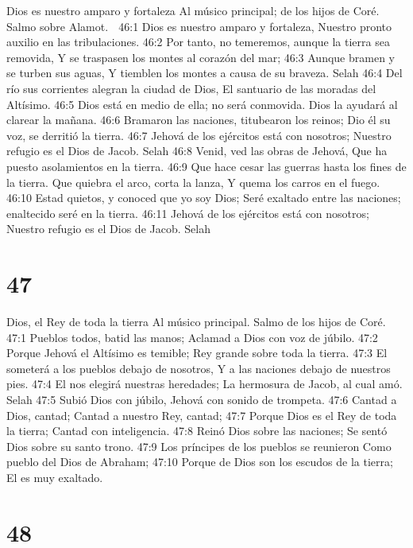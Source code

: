 Dios es nuestro amparo y fortaleza 
Al músico principal; de los hijos de Coré. Salmo sobre Alamot. 

46:1 Dios es nuestro amparo y fortaleza, 
Nuestro pronto auxilio en las tribulaciones. 
46:2 Por tanto, no temeremos, aunque la tierra sea removida, 
Y se traspasen los montes al corazón del mar; 
46:3 Aunque bramen y se turben sus aguas, 
Y tiemblen los montes a causa de su braveza. Selah 
46:4 Del río sus corrientes alegran la ciudad de Dios, 
El santuario de las moradas del Altísimo. 
46:5 Dios está en medio de ella; no será conmovida. 
Dios la ayudará al clarear la mañana. 
46:6 Bramaron las naciones, titubearon los reinos; 
Dio él su voz, se derritió la tierra. 
46:7 Jehová de los ejércitos está con nosotros; 
Nuestro refugio es el Dios de Jacob. Selah 
46:8 Venid, ved las obras de Jehová, 
Que ha puesto asolamientos en la tierra. 
46:9 Que hace cesar las guerras hasta los fines de la tierra. 
Que quiebra el arco, corta la lanza, 
Y quema los carros en el fuego. 
46:10 Estad quietos, y conoced que yo soy Dios; 
Seré exaltado entre las naciones; enaltecido seré en la tierra. 
46:11 Jehová de los ejércitos está con nosotros; 
Nuestro refugio es el Dios de Jacob. Selah 

\chapter{47}

Dios, el Rey de toda la tierra 
Al músico principal. Salmo de los hijos de Coré. 

47:1 Pueblos todos, batid las manos; 
Aclamad a Dios con voz de júbilo. 
47:2 Porque Jehová el Altísimo es temible; 
Rey grande sobre toda la tierra. 
47:3 El someterá a los pueblos debajo de nosotros, 
Y a las naciones debajo de nuestros pies. 
47:4 El nos elegirá nuestras heredades; 
La hermosura de Jacob, al cual amó. Selah 
47:5 Subió Dios con júbilo, 
Jehová con sonido de trompeta. 
47:6 Cantad a Dios, cantad; 
Cantad a nuestro Rey, cantad; 
47:7 Porque Dios es el Rey de toda la tierra; 
Cantad con inteligencia. 
47:8 Reinó Dios sobre las naciones; 
Se sentó Dios sobre su santo trono. 
47:9 Los príncipes de los pueblos se reunieron 
Como pueblo del Dios de Abraham; 
47:10 Porque de Dios son los escudos de la tierra; 
El es muy exaltado. 

\chapter{48}

